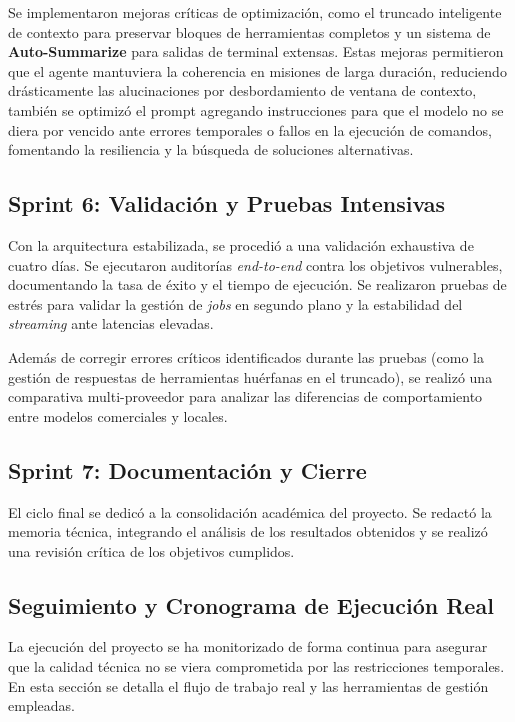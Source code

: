Se implementaron mejoras críticas de optimización, como el truncado inteligente de contexto para preservar bloques de herramientas completos y un sistema de \textbf{Auto-Summarize} para salidas de terminal extensas. Estas mejoras permitieron que el agente mantuviera la coherencia en misiones de larga duración, reduciendo drásticamente las alucinaciones por desbordamiento de ventana de contexto, también se optimizó el prompt agregando instrucciones para que el modelo no se diera por vencido ante errores temporales o fallos en la ejecución de comandos, fomentando la resiliencia y la búsqueda de soluciones alternativas.

\subsection*{Sprint 6: Validación y Pruebas Intensivas}

Con la arquitectura estabilizada, se procedió a una validación exhaustiva de cuatro días. Se ejecutaron auditorías \textit{end-to-end} contra los objetivos vulnerables, documentando la tasa de éxito y el tiempo de ejecución. Se realizaron pruebas de estrés para validar la gestión de \textit{jobs} en segundo plano y la estabilidad del \textit{streaming} ante latencias elevadas.

Además de corregir errores críticos identificados durante las pruebas (como la gestión de respuestas de herramientas huérfanas en el truncado), se realizó una comparativa multi-proveedor para analizar las diferencias de comportamiento entre modelos comerciales y locales.
\subsection*{Sprint 7: Documentación y Cierre}

El ciclo final se dedicó a la consolidación académica del proyecto. Se redactó la memoria técnica, integrando el análisis de los resultados obtenidos y se realizó una revisión crítica de los objetivos cumplidos. 

\subsection{Seguimiento y Cronograma de Ejecución Real}

La ejecución del proyecto se ha monitorizado de forma continua para asegurar que la calidad técnica no se viera comprometida por las restricciones temporales. En esta sección se detalla el flujo de trabajo real y las herramientas de gestión empleadas.

